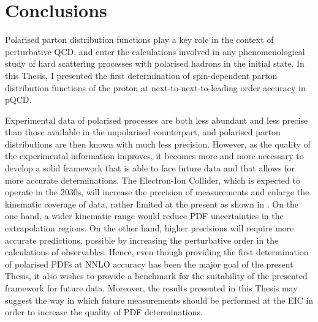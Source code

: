 \chapter{Conclusions}
\label{ch:5}

Polarised parton distribution functions play a key role in the context of perturbative QCD, and enter the calculations involved in any phenomenological study of hard scattering processes with polarised hadrons in the initial state. In this Thesis, I presented the first determination of spin-dependent parton distribution functions of the proton at next-to-next-to-leading order accuracy in pQCD.%

Experimental data of polarised processes are both less abundant and less precise than those available in the unpolarised counterpart, and polarised parton distributions are then known with much less precision. However, as the quality of the experimental information improves, it becomes more and more necessary to develop a solid framework that is able to face future data and that allows for more accurate determinations. The Electron-Ion Collider, which is expected to operate in the 2030s, will increase the precision of measurements and enlarge the kinematic coverage of data, rather limited at the present as shown in . On the one hand, a wider kinematic range would reduce PDF uncertainties in the extrapolation regions. On the other hand, higher precisions will require more accurate predictions, possible by increasing the perturbative order in the calculations of observables. Hence, even though providing the first determination of polarised PDFs at NNLO accuracy has been the major goal of the present Thesis, it also wishes to provide a benchmark for the suitability of the presented framework for future data. Moreover, the results presented in this Thesis may suggest the way in which future measurements should be performed at the EIC in order to increase the quality of PDF determinations.%

